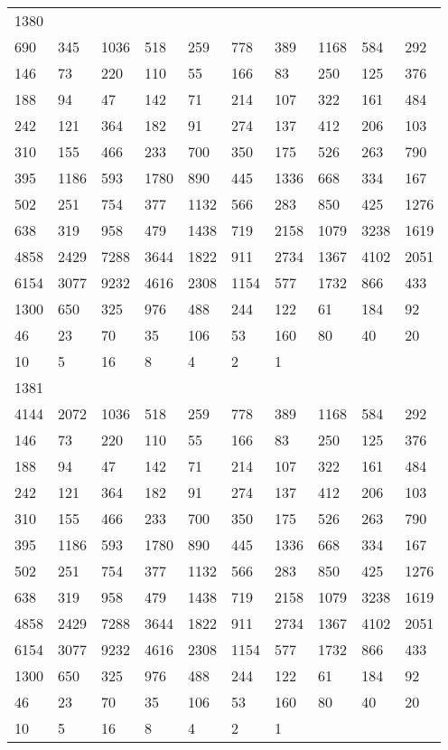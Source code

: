 \begin{longtable}{*{10}{l}}
1380&&&&&&&&&\\
690& 345& 1036& 518& 259& 778& 389& 1168& 584& 292\\
146& 73& 220& 110& 55& 166& 83& 250& 125& 376\\
188& 94& 47& 142& 71& 214& 107& 322& 161& 484\\
242& 121& 364& 182& 91& 274& 137& 412& 206& 103\\
310& 155& 466& 233& 700& 350& 175& 526& 263& 790\\
395& 1186& 593& 1780& 890& 445& 1336& 668& 334& 167\\
502& 251& 754& 377& 1132& 566& 283& 850& 425& 1276\\
638& 319& 958& 479& 1438& 719& 2158& 1079& 3238& 1619\\
4858& 2429& 7288& 3644& 1822& 911& 2734& 1367& 4102& 2051\\
6154& 3077& 9232& 4616& 2308& 1154& 577& 1732& 866& 433\\
1300& 650& 325& 976& 488& 244& 122& 61& 184& 92\\
46& 23& 70& 35& 106& 53& 160& 80& 40& 20\\
10& 5& 16& 8& 4& 2& 1& \\

1381&&&&&&&&&\\
4144& 2072& 1036& 518& 259& 778& 389& 1168& 584& 292\\
146& 73& 220& 110& 55& 166& 83& 250& 125& 376\\
188& 94& 47& 142& 71& 214& 107& 322& 161& 484\\
242& 121& 364& 182& 91& 274& 137& 412& 206& 103\\
310& 155& 466& 233& 700& 350& 175& 526& 263& 790\\
395& 1186& 593& 1780& 890& 445& 1336& 668& 334& 167\\
502& 251& 754& 377& 1132& 566& 283& 850& 425& 1276\\
638& 319& 958& 479& 1438& 719& 2158& 1079& 3238& 1619\\
4858& 2429& 7288& 3644& 1822& 911& 2734& 1367& 4102& 2051\\
6154& 3077& 9232& 4616& 2308& 1154& 577& 1732& 866& 433\\
1300& 650& 325& 976& 488& 244& 122& 61& 184& 92\\
46& 23& 70& 35& 106& 53& 160& 80& 40& 20\\
10& 5& 16& 8& 4& 2& 1& \\


\end{longtable}
